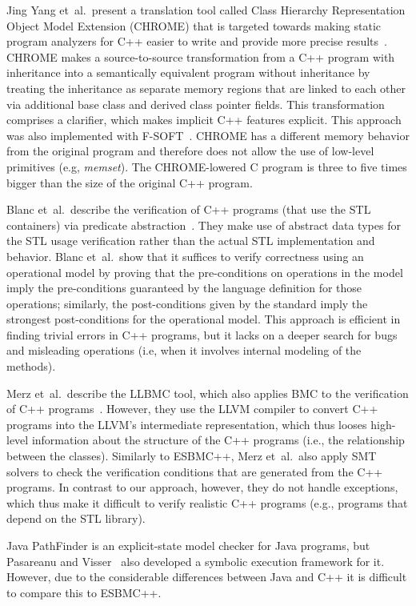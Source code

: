 \documentclass[conference]{IEEEtran}
\begin{document}
Jing Yang et~al.\ present a translation tool called Class Hierarchy
Representation Object Model Extension (CHROME) that is targeted towards
making static program analyzers for C++ easier to write and provide
more precise results~\cite{Yang12}. CHROME makes a source-to-source transformation
from a C++ program with inheritance into a semantically equivalent program without
inheritance by treating the inheritance as separate memory regions
that are linked to each other via additional base class and derived class
pointer fields. This transformation comprises a clarifier, which makes
implicit C++ features explicit. This approach was also implemented with
F-SOFT~\cite{Fsoft}. CHROME has a
different memory behavior from the original program and therefore does not allow
the use of low-level primitives (e.g, \textit{memset}). The CHROME-lowered C program is
three to five times bigger than the size of the original C++ program.

Blanc et~al.\ describe the verification of C++ programs (that use the STL containers)
via predicate abstraction~\cite{Blanc07}. They make use of abstract data types for the STL
usage verification rather than the actual STL implementation and behavior.
Blanc et~al.\ show that it suffices to verify correctness using an operational model
by proving that the pre-conditions on operations in the model imply the pre-conditions
guaranteed by the language definition for those operations; similarly, the post-conditions
given by the standard imply the strongest post-conditions for the operational model.
This approach is efficient in finding trivial errors in C++ programs, but it lacks
on a deeper search for bugs and misleading operations (i.e, when it involves internal
modeling of the methods).

Merz et~al.\ describe the LLBMC tool, which also applies BMC to the verification
of C++ programs~\cite{Florian12}. However, they use the LLVM compiler to convert C++
programs into the LLVM's intermediate representation, which thus looses high-level
information about the structure of the C++ programs (i.e., the relationship between
the classes). Similarly to ESBMC++, Merz et~al.\ also apply SMT solvers to check the verification
conditions that are generated from the C++ programs. In contrast to our approach, however,
they do not handle exceptions, which thus make it difficult to verify realistic C++ programs
(e.g., programs that depend on the STL library).

Java PathFinder is an explicit-state model checker for Java programs, but
Pasareanu and Visser~\cite{Pasareanu04} also developed a symbolic execution
framework for it. However, due to the considerable differences between
Java and C++ it is difficult to compare this to ESBMC++.
\end{document}
